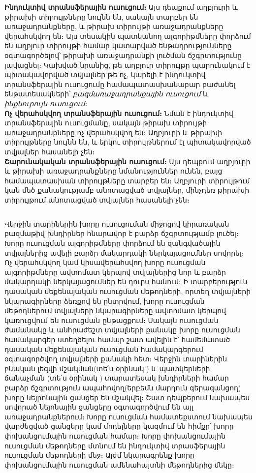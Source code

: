 \documentclass[12pt]{article}
\begin{document}
\noindent \textbf{Ինդուկտիվ տրանսֆերային ուսուցում։}  Այս դեպքում աղբյուրի և թիրախի տիրույթները նույնն են, սակայն տարբեր են առաջադրանքները, և թիրախ տիրույթի առաջադրանքները վերահսկվող են։ Այս տեսակին պատկանող ալգորիթմները փորձում են աղբյուր տիրույթի համար կատարված ենթադրությունները օգտագործելով՝  թիրախի առաջադրանքի լուծման ճշգրտությունը լավացնել։ Կախված նրանից, թե աղբյուր տիրույթը պարունակում է պիտակավորված տվյալներ թե ոչ,  կարելի է ինդուկտիվ տրանսֆերային ուսուցումը համապատասխանաբար բաժանել ենթատեսակների՝ \textit{բազմառաջադրանքային ուսուցում} և  \textit{ինքնուրույն ուսուցում}։\\

\noindent \textbf{Ոչ վերահսկվող տրանսֆերային ուսուցում։} Նման է ինդուկտիվ տրանսֆերային ուսուցմանը, սակայն թիրախ տիրույթի առաջադրանքները ոչ վերահսկվող  են։ Աղբյուրի և թիրախի տիրույթները  նույնն են, և երկու տիրույթներում էլ պիտակավորված տվյալներ հասանելի չեն։ \\


\noindent \textbf{Շարունակական տրանսֆերային ուսուցում։}
Այս դեպքում աղբյուրի և թիրախի առաջադրանքները նմանություններ ունեն, բայց համապատասխան տիրույթները տարբեր են։ Աղբյուրի տիրույթում կան մեծ քանակությամբ անոտացված տվյալներ, մինչդեռ թիրախի տիրույթում անոտացված տվյալներ հասանելի չեն։ \\

\begin{center}
\subsection*{
 } 
 \end{center}
 \noindent
{}
{}

Վերջին տարիներին խորը ուսուցուման միջոցով կիրառական բազմաթիվ խնդիրներ հնարավոր է բարձր ճշգրտությամբ լուծել։ Խորը ուսուցման ալգորիթմները փորձում են զանգվածային տվյալներից ավելի բարձր մակարդակի  ներկայացումներ սովորել։  Ոչ վերահսկվող կամ կիսավերահսվող խորը ուսուցման ալգորիթմները ավտոմատ կերպով տվյալներից նոր և բարձր մակարդակի ներկայացումներ են դուրս հանում։ Ի տարբերություն դասական մեքենայական ուսուցման մեթոդների, որտեղ  տվյալների նկարագիրները ձեռքով են ընտրվում,  խորը ուսուցման մեթոդներում տվյալների նկարագիրները ավտոմատ կերպով կառուցվում են ուսուցման ընթացքում։ Սակայն ուսուցման ժամանակը և անհրաժեշտ տվյալների քանակը խորը ուսուցման համակարգեր ստեղծելու համար շատ ավելին է՝ համեմատած դասական մեքենայական ուսուցման համակարգերում օգտագործվող տվյալների քանակի հետ։ Վերջին տարիներին բնական լեզվի մշակման(տե՛ս օրինակ \cite{bib_item_19, bib_item_6, bib_item_7}) և պատկերների ճանաչման (տե՛ս օրինակ \cite{bib_item_15, bib_item_16, bib_item_4, bib_item_5}) տարատեսակ խնդիրների համար բարձր ճշգրտություն ապահովող(երբեմն մարդուն գերազանցող) խորը նեյրոնային ցանցեր են  մշակվել։ Շատ դեպքերում նախապես սովորած նեյոնային ցանցերը օգտագործվում են այլ առաջադրանքներում։ Խորը ուսուցման համատեքստում նախապես վարժեցված ցանցերը կամ մոդելները կազմում են հիմքը՝  խորը փոխանցումային ուսուցման համար։ Խորը փոխանցումային ուսուցման մեթոդները մտնում են ինդուկտիվ տրասֆերային ուսուցման մեթոդների մեջ։ Այժմ նկարագրենք խորը փոխանցումային ուսուցման ամենահայտնի մեթոդներից մեկը։ \\
\end{document}
